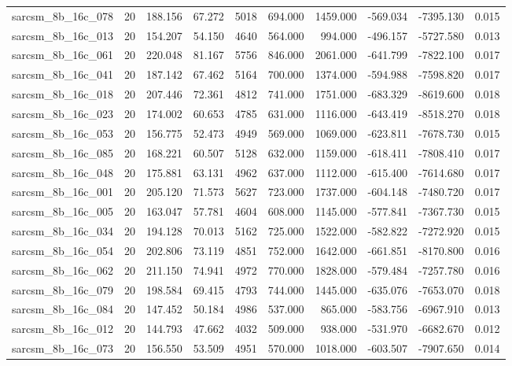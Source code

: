 \begin{tabular}{lrrrrrrrrr}
sarcsm\_8b\_16c\_078 & 20 & 188.156 & 67.272 & 5018 & 694.000 & 1459.000 & -569.034 & -7395.130 & 0.015 \\
sarcsm\_8b\_16c\_013 & 20 & 154.207 & 54.150 & 4640 & 564.000 & 994.000 & -496.157 & -5727.580 & 0.013 \\
sarcsm\_8b\_16c\_061 & 20 & 220.048 & 81.167 & 5756 & 846.000 & 2061.000 & -641.799 & -7822.100 & 0.017 \\
sarcsm\_8b\_16c\_041 & 20 & 187.142 & 67.462 & 5164 & 700.000 & 1374.000 & -594.988 & -7598.820 & 0.017 \\
sarcsm\_8b\_16c\_018 & 20 & 207.446 & 72.361 & 4812 & 741.000 & 1751.000 & -683.329 & -8619.600 & 0.018 \\
sarcsm\_8b\_16c\_023 & 20 & 174.002 & 60.653 & 4785 & 631.000 & 1116.000 & -643.419 & -8518.270 & 0.018 \\
sarcsm\_8b\_16c\_053 & 20 & 156.775 & 52.473 & 4949 & 569.000 & 1069.000 & -623.811 & -7678.730 & 0.015 \\
sarcsm\_8b\_16c\_085 & 20 & 168.221 & 60.507 & 5128 & 632.000 & 1159.000 & -618.411 & -7808.410 & 0.017 \\
sarcsm\_8b\_16c\_048 & 20 & 175.881 & 63.131 & 4962 & 637.000 & 1112.000 & -615.400 & -7614.680 & 0.017 \\
sarcsm\_8b\_16c\_001 & 20 & 205.120 & 71.573 & 5627 & 723.000 & 1737.000 & -604.148 & -7480.720 & 0.017 \\
sarcsm\_8b\_16c\_005 & 20 & 163.047 & 57.781 & 4604 & 608.000 & 1145.000 & -577.841 & -7367.730 & 0.015 \\
sarcsm\_8b\_16c\_034 & 20 & 194.128 & 70.013 & 5162 & 725.000 & 1522.000 & -582.822 & -7272.920 & 0.015 \\
sarcsm\_8b\_16c\_054 & 20 & 202.806 & 73.119 & 4851 & 752.000 & 1642.000 & -661.851 & -8170.800 & 0.016 \\
sarcsm\_8b\_16c\_062 & 20 & 211.150 & 74.941 & 4972 & 770.000 & 1828.000 & -579.484 & -7257.780 & 0.016 \\
sarcsm\_8b\_16c\_079 & 20 & 198.584 & 69.415 & 4793 & 744.000 & 1445.000 & -635.076 & -7653.070 & 0.018 \\
sarcsm\_8b\_16c\_084 & 20 & 147.452 & 50.184 & 4986 & 537.000 & 865.000 & -583.756 & -6967.910 & 0.013 \\
sarcsm\_8b\_16c\_012 & 20 & 144.793 & 47.662 & 4032 & 509.000 & 938.000 & -531.970 & -6682.670 & 0.012 \\
sarcsm\_8b\_16c\_073 & 20 & 156.550 & 53.509 & 4951 & 570.000 & 1018.000 & -603.507 & -7907.650 & 0.014 \\

\end{tabular}
